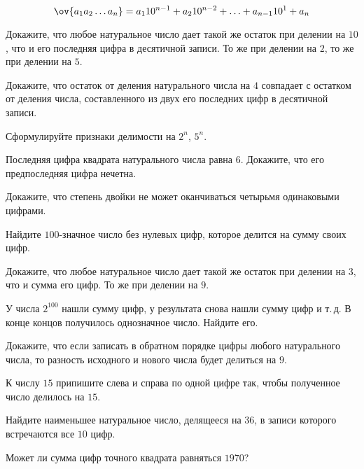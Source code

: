 
\[
    \ov{a_1 a_2 \ldots a_n}
=
    a_1 10^{n - 1} + a_2 10^{n - 2} + \ldots + a_{n - 1} 10^1 + a_n
\]

\begin{problems}

\item
Докажите, что любое натуральное число дает такой же остаток при делении на
$10$, что и его последняя цифра в десятичной записи.
То же при делении на $2$, то же при делении на $5$.

\item
Докажите, что остаток от деления натурального числа на $4$ совпадает с
остатком от деления числа, составленного из двух его последних цифр в
десятичной записи. 

\item
Сформулируйте признаки делимости на $2^n$, $5^n$.

\item
Последняя цифра квадрата натурального числа равна $6$.
Докажите, что его предпоследняя цифра нечетна.

\item
Докажите, что степень двойки не может оканчиваться четырьмя одинаковыми
цифрами.

\item
Найдите $100$-значное число без нулевых цифр, которое делится на сумму своих
цифр.

\item
Докажите, что любое натуральное число дает такой же остаток при делении на $3$,
что и сумма его цифр.
То же при делении на $9$.

\item
У числа $2^{100}$ нашли сумму цифр, у результата снова нашли сумму цифр и
т.\,д.
В конце концов получилось однозначное число.  Найдите его.

\item
Докажите, что если записать в обратном порядке цифры любого натурального числа,
то разность исходного и нового числа будет делиться на $9$.

\item
К числу $15$ припишите слева и справа по одной цифре так, чтобы полученное
число делилось на $15$.

\item
Найдите наименьшее натуральное число, делящееся на $36$, в записи которого
встречаются все $10$ цифр.

\item
Может ли сумма цифр точного квадрата равняться $1970$?


\end{problems}
